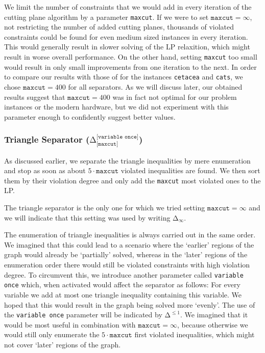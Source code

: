 We limit the number of constraints that we would add in every iteration of the cutting plane algorithm by a parameter \texttt{maxcut}.
If we were to set $\texttt{maxcut} = \infty$, \ie not restricting the number of added cutting planes, thousands of violated constraints could be found for even medium sized instances in every iteration.
This would generally result in slower solving of the LP relaxition, which might result in worse overall performance.
On the other hand, setting \texttt{maxcut} too small would result in only small improvements from one iteration to the next.
In order to compare our results with those of \cite{grotschelCuttingPlaneAlgorithm1989} for the instances \texttt{cetacea} and \texttt{cats}, we chose $\texttt{maxcut} = 400$ for all separators.
As we will discuss later, our obtained results suggest that $\texttt{maxcut} = 400$ was in fact not optimal for our problem instances or the modern hardware,
but we did not experiment with this parameter enough to confidently suggest better values.

\subsubsection{Triangle Separator (\texorpdfstring{$\texttt{Δ}_{\texttt{[maxcut]}}^{\texttt{[variable once]}}$}{Δ})}
As discussed earlier, we separate the triangle inequalities by mere enumeration and stop as soon as about $5\cdot\texttt{maxcut}$ violated inequalities are found.
We then sort them by their violation degree and only add the \texttt{maxcut} most violated ones to the LP.

The triangle separator is the only one for which we tried setting $\texttt{maxcut} = \infty$ and we will indicate that this setting was used by writing $\texttt{Δ}_{\infty}$.

The enumeration of triangle inequalities is always carried out in the same order.
We imagined that this could lead to a scenario where the ‘earlier’ regions of the graph would already be ‘partially’ solved, whereas in the ‘later’ regions of the enumeration order there would still be violated constraints with high violation degree.
To circumvent this, we introduce another parameter called \texttt{variable once} which, when activated would affect the separator as follows:
For every variable we add at most one triangle inequality containing this variable.
We hoped that this would result in the graph being solved more ‘evenly’.
The use of the \texttt{variable once} parameter will be indicated by $\texttt{Δ}^{\leq 1}$.
We imagined that it would be most useful in combination with $\texttt{maxcut} = \infty$, because otherwise we would still only enumerate the $5 \cdot \texttt{maxcut}$ first violated inequalities, which might not cover ‘later’ regions of the graph.

